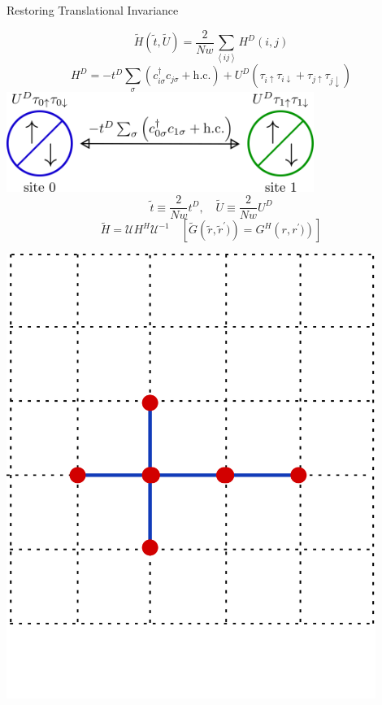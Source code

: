 \documentclass[aspectratio=169]{beamer}
\begin{document}
\begin{frame}{Restoring Translational Invariance}
\begin{minipage}{0.55\textwidth}
	\centering
	\[\tilde H(\tilde t, \tilde U) = \frac{2}{Nw}\sum_{\left<ij \right>}H^D(i,j)\]
	\[H^D = -{t}^D\sum_{\sigma}\left(c^\dagger_{i\sigma}c_{j\sigma} + \text{h.c.}\right) + U^D\left(\tau_{i \uparrow} \tau_{i \downarrow} + \tau_{j \uparrow} \tau_{j \downarrow}\right)\]
	\includegraphics[width=0.75\textwidth]{./hubb_dim.png}
	\[\tilde t \equiv \frac{2}{Nw}t^D, \quad\tilde U \equiv \frac{2}{Nw}U^D\]
	\[\tilde H = \mathcal{U}H^H\mathcal{U}^{-1} \quad\left[\tilde G\left(\tilde r,\tilde r^\prime)\right) = G^H\left( r, r^\prime)\right)\right]\]
\end{minipage}
\hspace*{\fill}
\begin{minipage}{0.4\textwidth}
	\centering
	\includegraphics[width=0.9\textwidth]{./tiling.png}
\end{minipage}
\end{frame}
\end{document}
